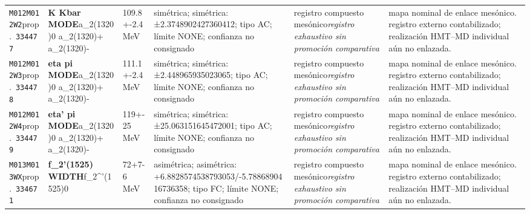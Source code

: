 \begin{landscape}
\begin{longtable}{L{1.85cm}L{4.45cm}L{2.35cm}L{4.05cm}L{3.35cm}L{7.15cm}}
\texttt{M012}\newline \texttt{M012W2}\newline prop.\ \texttt{334477} & \textbf{K Kbar MODE}\newline a\_\allowbreak{}2(1320)0 \textbar{}\allowbreak{} a\_\allowbreak{}2(1320)+ \textbar{}\allowbreak{} a\_\allowbreak{}2(1320)- & 109.8+-2.4\,MeV & simétrica; simétrica: ±2.3748902427360412; tipo AC; límite NONE; confianza no consignado & registro compuesto mesónico\newline \emph{registro exhaustivo sin promoción comparativa} & mapa nominal de enlace mesónico. registro externo contabilizado; realización HMT--MD individual aún no enlazada. \\
\texttt{M012}\newline \texttt{M012W3}\newline prop.\ \texttt{334478} & \textbf{eta pi MODE}\newline a\_\allowbreak{}2(1320)0 \textbar{}\allowbreak{} a\_\allowbreak{}2(1320)+ \textbar{}\allowbreak{} a\_\allowbreak{}2(1320)- & 111.1+-2.4\,MeV & simétrica; simétrica: ±2.448965935023065; tipo AC; límite NONE; confianza no consignado & registro compuesto mesónico\newline \emph{registro exhaustivo sin promoción comparativa} & mapa nominal de enlace mesónico. registro externo contabilizado; realización HMT--MD individual aún no enlazada. \\
\texttt{M012}\newline \texttt{M012W4}\newline prop.\ \texttt{334479} & \textbf{eta' pi MODE}\newline a\_\allowbreak{}2(1320)0 \textbar{}\allowbreak{} a\_\allowbreak{}2(1320)+ \textbar{}\allowbreak{} a\_\allowbreak{}2(1320)- & 119+-25\,MeV & simétrica; simétrica: ±25.063151645472001; tipo AC; límite NONE; confianza no consignado & registro compuesto mesónico\newline \emph{registro exhaustivo sin promoción comparativa} & mapa nominal de enlace mesónico. registro externo contabilizado; realización HMT--MD individual aún no enlazada. \\
\texttt{M013}\newline \texttt{M013WX}\newline prop.\ \texttt{334671} & \textbf{f\_\allowbreak{}2'(1525) WIDTH}\newline f\_\allowbreak{}2\textasciicircum{}'(1525)0 & 72+7-6\,MeV & asimétrica; asimétrica: +6.8828574538793053/-5.7886890416736358; tipo FC; límite NONE; confianza no consignado & registro compuesto mesónico\newline \emph{registro exhaustivo sin promoción comparativa} & mapa nominal de enlace mesónico. registro externo contabilizado; realización HMT--MD individual aún no enlazada. \\

\end{longtable}
\end{landscape}
